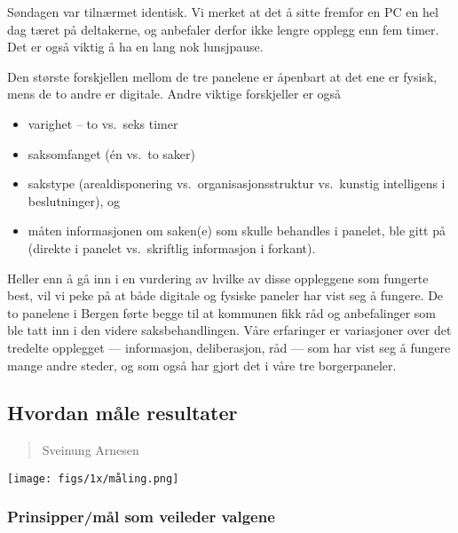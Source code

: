 \documentclass[
  12pt,
  a4paper, 12pt]{article}
\providecommand{\tightlist}{%
  \setlength{\itemsep}{0pt}\setlength{\parskip}{0pt}}
\begin{document}
Søndagen var tilnærmet identisk. Vi merket at det å sitte fremfor en PC en hel dag tæret på deltakerne, og anbefaler derfor ikke lengre opplegg enn fem timer. Det er også viktig å ha en lang nok lunsjpause.

Den største forskjellen mellom de tre panelene er åpenbart at det ene er fysisk, mens de to andre er digitale. Andre viktige forskjeller er også

\begin{itemize}
\tightlist
\item
  varighet -- to vs.~seks timer\\
\item
  saksomfanget (én vs.~to saker)\\
\item
  sakstype (arealdisponering vs.~organisasjonsstruktur vs.~kunstig intelligens i beslutninger), og\\
\item
  måten informasjonen om saken(e) som skulle behandles i panelet, ble gitt på (direkte i panelet vs.~skriftlig informasjon i forkant).
\end{itemize}

Heller enn å gå inn i en vurdering av hvilke av disse oppleggene som fungerte best, vil vi peke på at både digitale og fysiske paneler har vist seg å fungere. De to panelene i Bergen førte begge til at kommunen fikk råd og anbefalinger som ble tatt inn i den videre saksbehandlingen. Våre erfaringer er variasjoner over det tredelte opplegget --- informasjon, deliberasjon, råd --- som har vist seg å fungere mange andre steder, og som også har gjort det i våre tre borgerpaneler.

\newpage

\hypertarget{hvordan-muxe5le-resultater}{%
\subsection{Hvordan måle resultater}\label{hvordan-muxe5le-resultater}}

\begin{quote}
Sveinung Arnesen
\end{quote}

\texttt{[image: figs/1x/måling.png]}

\hypertarget{prinsippermuxe5l-som-veileder-valgene-1}{%
\subsubsection{Prinsipper/mål som veileder valgene}\label{prinsippermuxe5l-som-veileder-valgene-1}}
\end{document}
